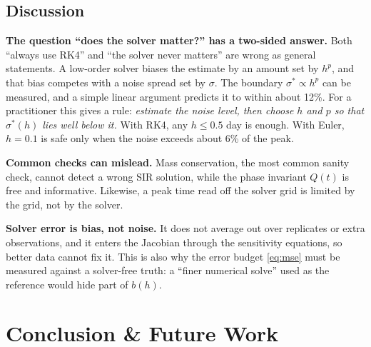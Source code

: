 \documentclass[sigconf]{acmart}
\begin{document}
\subsection{Discussion}
\label{sec:discussion}
\textbf{The question ``does the solver matter?'' has a two-sided
answer.} Both ``always use RK4'' and ``the solver never matters'' are
wrong as general statements. A low-order solver biases the estimate by
an amount set by $h^p$, and that bias competes with a noise spread set by
$\sigma$. The boundary $\sigma^*\propto h^p$ can be measured, and a
simple linear argument predicts it to within about 12\%. For a
practitioner this gives a rule: \emph{estimate the noise level, then
choose $h$ and $p$ so that $\sigma^*(h)$ lies well below it.} With RK4,
any $h\le0.5$ day is enough. With Euler, $h=0.1$ is safe only when the
noise exceeds about 6\% of the peak.

\textbf{Common checks can mislead.} Mass conservation, the most common
sanity check, cannot detect a wrong SIR solution, while the phase
invariant $Q(t)$ is free and informative. Likewise, a peak time read off
the solver grid is limited by the grid, not by the solver.

\textbf{Solver error is bias, not noise.} It does not average out over
replicates or extra observations, and it enters the Jacobian through
the sensitivity equations, so better data cannot fix it. This is also
why the error budget \eqref{eq:mse} must be measured against a
solver-free truth: a ``finer numerical solve'' used as the reference
would hide part of $b(h)$.

\section{Conclusion \& Future Work}
\label{sec:conclusion}
\end{document}
